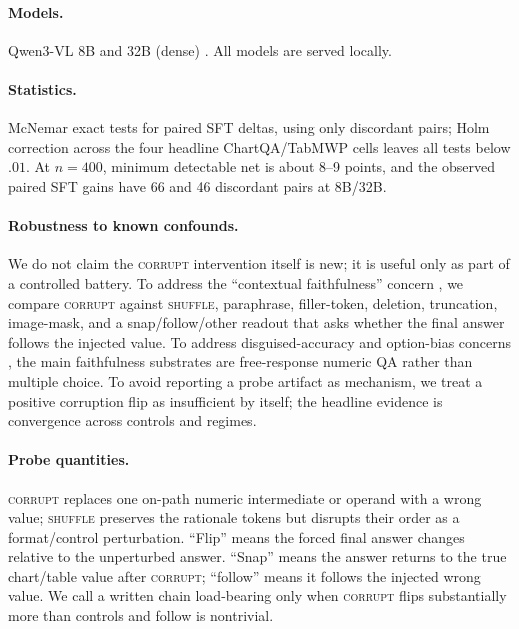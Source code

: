 \documentclass[11pt]{article}
\newcommand{\corrupt}{\textsc{corrupt}}
\newcommand{\shuffle}{\textsc{shuffle}}
\begin{document}
\paragraph{Models.}
Qwen3-VL 8B and 32B (dense) \citep{qwen3vl}. All models are served locally.

\paragraph{Statistics.}
McNemar exact tests for paired SFT deltas, using only discordant pairs; Holm correction across the four headline ChartQA/TabMWP cells leaves all tests below $.01$. At $n{=}400$, minimum detectable net is about 8--9 points, and the observed paired SFT gains have 66 and 46 discordant pairs at 8B/32B.

\paragraph{Robustness to known confounds.}
We do not claim the \corrupt{} intervention itself is new; it is useful only as part of a controlled battery. To address the ``contextual faithfulness'' concern \citep{tutek2025}, we compare \corrupt{} against \shuffle{}, paraphrase, filler-token, deletion, truncation, image-mask, and a snap/follow/other readout that asks whether the final answer follows the injected value. To address disguised-accuracy and option-bias concerns \citep{bentham2024}, the main faithfulness substrates are free-response numeric QA rather than multiple choice. To avoid reporting a probe artifact as mechanism, we treat a positive corruption flip as insufficient by itself; the headline evidence is convergence across controls and regimes.

\paragraph{Probe quantities.}
\corrupt{} replaces one on-path numeric intermediate or operand with a wrong value; \shuffle{} preserves the rationale tokens but disrupts their order as a format/control perturbation. ``Flip'' means the forced final answer changes relative to the unperturbed answer. ``Snap'' means the answer returns to the true chart/table value after \corrupt{}; ``follow'' means it follows the injected wrong value. We call a written chain load-bearing only when \corrupt{} flips substantially more than controls and follow is nontrivial.
\end{document}
